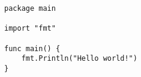 







\clearpage
\tableofcontents
\clearpage 

\lstset{style=go}



\begin{lstlisting}[title=\dq{Hola mundo} en Go]
package main

import "fmt"

func main() {
    fmt.Println("Hello world!")
}
\end{lstlisting}





\clearpage
\printbibliography



